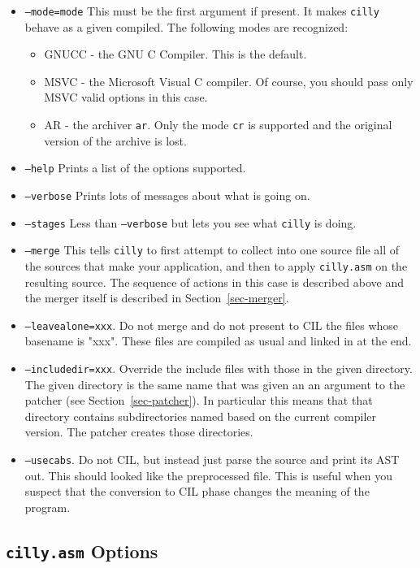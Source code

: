 \documentclass{article}
\def\secref#1{Section~\ref{sec-#1}}
\def\t#1{{\tt #1}}
\begin{document}
\begin{itemize}
\item \t{--mode=mode} This must be the first argument if present. It makes
\t{cilly} behave as a given compiled. The following modes are recognized: 
     \begin{itemize}
        \item GNUCC - the GNU C Compiler. This is the default.
        \item MSVC - the Microsoft Visual C compiler. Of course, you should
                     pass only MSVC valid options in this case. 
        \item AR - the archiver \t{ar}. Only the mode \t{cr} is supported and
                   the original version of the archive is lost. 
     \end{itemize}
\item \t{--help} Prints a list of the options supported.
\item \t{--verbose} Prints lots of messages about what is going on.
\item \t{--stages} Less than \t{--verbose} but lets you see what \t{cilly}
                   is doing. 
\item \t{--merge} This tells \t{cilly} to first attempt to collect into one
source file all of the sources that make your application, and then to apply
\t{cilly.asm} on the resulting source. The sequence of actions in this case is
described above and the merger itself is described in \secref{merger}.

\item \t{--leavealone=xxx}. Do not merge and do not present to CIL the files
whose basename is "xxx". These files are compiled as usual and linked in at
the end. 
\item \t{--includedir=xxx}. Override the include files with those in the given
directory. The given directory is the same name that was given an an argument
to the patcher (see \secref{patcher}). In particular this means that
that directory contains subdirectories named based on the current compiler
version. The patcher creates those directories. 
\item \t{--usecabs}. Do not CIL, but instead just parse the source and print
its AST out. This should looked like the preprocessed file. This is useful
when you suspect that the conversion to CIL phase changes the meaning of the
program. 
\end{itemize}
 
 
  \subsection{\t{cilly.asm} Options}
\end{document}
